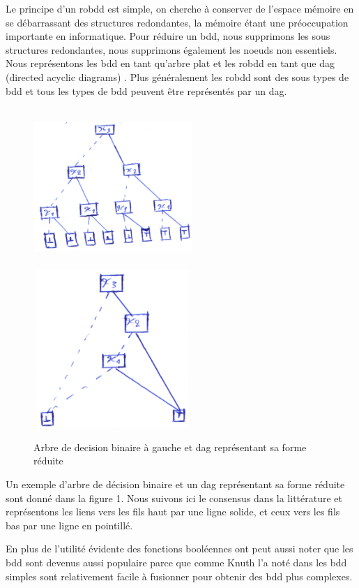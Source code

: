 \documentclass[french]{article}
\begin{document}
Le principe d'un robdd est simple, on cherche à conserver de l'espace mémoire en se débarrassant des structures redondantes, la mémoire étant une préoccupation importante en informatique. Pour réduire un bdd, nous supprimons les sous structures redondantes, nous supprimons également les noeuds non essentiels. Nous représentons les bdd en tant qu'arbre plat et les robdd en tant que dag (directed acyclic diagrams) \cite{flajolet_automata}. Plus généralement les robdd sont des sous types de bdd et tous les types de bdd peuvent être représentés par un dag.\medskip

\begin{figure}[htp]
    \centering
    \includegraphics[width=6cm, height=6cm]{tree019}
    \includegraphics[width=6cm, height=6cm]{tree020}
    \caption{Arbre de decision binaire à gauche et dag représentant sa forme réduite}
    \label{fig:Figure1.1}
\end{figure}
\newpage
Un exemple d'arbre de décision binaire et un dag représentant sa forme réduite sont donné dans la figure 1. Nous suivons ici le consensus dans la littérature et représentons les liens vers les fils haut par une ligne solide, et ceux vers les fils bas par une ligne en pointillé.\medskip

En plus de l'utilité évidente des fonctions booléennes ont peut aussi noter que les bdd sont devenus aussi populaire parce que comme Knuth l'a noté dans \cite{knuth} les bdd simples sont relativement facile à fusionner pour obtenir des bdd plus complexes.\medskip
\end{document}
